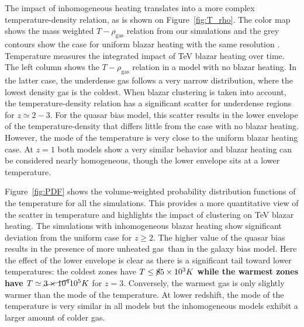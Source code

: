 \documentclass[numberedappendix]{emulateapj}
\newcommand\ALc[1]{{\color{red} \bf #1}} %
\begin{document}
The impact of inhomogeneous heating translates into a more complex temperature-density relation, as is shown on Figure~\ref{fig:T_rho}. The color map shows the mass weighted $T-\rho_{\mathrm{gas}}$ relation from our simulations and the grey contours show the case for uniform blazar heating with the same resolution \citep{2012MNRAS.423..149P}. Temperature measures the integrated impact of TeV blazar heating over time. The left column shows the $T-\rho_{\mathrm{gas}}$ relation in a model with no blazar heating. In the latter case, the underdense gas follows a very narrow distribution, where the lowest density gas is the coldest.  When blazar clustering is taken into account, the temperature-density relation has a significant scatter for underdense regions for $z\simeq 2-3$. For the quasar bias model, this scatter results in the lower envelope of the temperature-density that differs little from the case with no blazar heating. However, the mode of the temperature is very close to the uniform blazar heating case. At $z=1$  both models show a very similar behavior and blazar heating can be considered nearly homogeneous, though the lower envelope sits at a lower temperature.

Figure~\ref{fig:PDF} shows the volume-weighted probability distribution functions of the temperature for all the simulations. This provides a more quantitative view of the scatter in temperature and highlights the impact of clustering on TeV blazar heating. The simulations with  inhomogeneous blazar heating show significant deviation from the uniform case  for $z\geqslant 2$. The higher value of the quasar bias results in the presence of more unheated gas\ than in the galaxy bias model. Here the effect of the lower envelope is clear as there is a significant tail toward lower temperatures: the coldest zones have \ALc{$T\leq \cancel{8} 5 \times 10^3K$ while the warmest zones have $T\simeq \cancel{3 \times 10^4}  10^5K$} for $z=3$. Conversely, the warmest gas is only slightly warmer than the mode of the temperature. At lower redshift, the mode of the temperature is very similar in all models but the inhomogeneous models exhibit a larger amount of colder gas.

\end{document}
